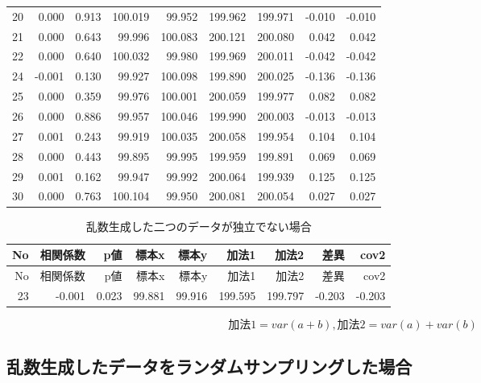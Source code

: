 \documentclass[]{tufte-handout}
\begin{document}
\begin{longtable}[]{@{}rrrrrrrrr@{}}
20 & 0.000 & 0.913 & 100.019 & 99.952 & 199.962 & 199.971 & -0.010 &
-0.010 \\
21 & 0.000 & 0.643 & 99.996 & 100.083 & 200.121 & 200.080 & 0.042 &
0.042 \\
22 & 0.000 & 0.640 & 100.032 & 99.980 & 199.969 & 200.011 & -0.042 &
-0.042 \\
24 & -0.001 & 0.130 & 99.927 & 100.098 & 199.890 & 200.025 & -0.136 &
-0.136 \\
25 & 0.000 & 0.359 & 99.976 & 100.001 & 200.059 & 199.977 & 0.082 &
0.082 \\
26 & 0.000 & 0.886 & 99.957 & 100.046 & 199.990 & 200.003 & -0.013 &
-0.013 \\
27 & 0.001 & 0.243 & 99.919 & 100.035 & 200.058 & 199.954 & 0.104 &
0.104 \\
28 & 0.000 & 0.443 & 99.895 & 99.995 & 199.959 & 199.891 & 0.069 &
0.069 \\
29 & 0.001 & 0.162 & 99.947 & 99.992 & 200.064 & 199.939 & 0.125 &
0.125 \\
30 & 0.000 & 0.763 & 100.104 & 99.950 & 200.081 & 200.054 & 0.027 &
0.027 \\
\bottomrule
\end{longtable}

\begin{longtable}[]{@{}rrrrrrrrr@{}}
\caption{乱数生成した二つのデータが独立でない場合}\tabularnewline
\toprule
No & 相関係数 & p値 & 標本x & 標本y & 加法1 & 加法2 & 差異 & cov2 \\
\midrule
\endfirsthead
\toprule
No & 相関係数 & p値 & 標本x & 標本y & 加法1 & 加法2 & 差異 & cov2 \\
\midrule
\endhead
23 & -0.001 & 0.023 & 99.881 & 99.916 & 199.595 & 199.797 & -0.203 &
-0.203 \\
\bottomrule
\end{longtable}

\[\mbox{加法1} = var(a + b),　\mbox{加法2} = var(a) + var(b)\]

\newpage

\hypertarget{ux4e71ux6570ux751fux6210ux3057ux305fux30c7ux30fcux30bfux3092ux30e9ux30f3ux30c0ux30e0ux30b5ux30f3ux30d7ux30eaux30f3ux30b0ux3057ux305fux5834ux5408}{%
\subsection{\texorpdfstring{\textbf{乱数生成したデータをランダムサンプリングした場合}}{乱数生成したデータをランダムサンプリングした場合}}\label{ux4e71ux6570ux751fux6210ux3057ux305fux30c7ux30fcux30bfux3092ux30e9ux30f3ux30c0ux30e0ux30b5ux30f3ux30d7ux30eaux30f3ux30b0ux3057ux305fux5834ux5408}}
\end{document}
